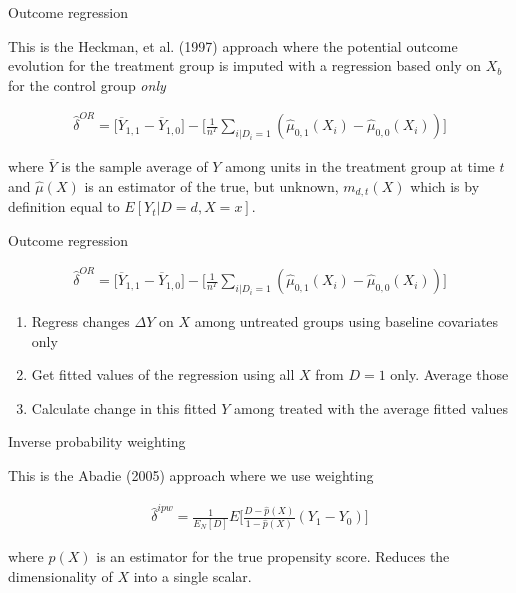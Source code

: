 \documentclass{beamer}
\begin{document}
\begin{frame}{Outcome regression}

This is the Heckman, et al. (1997) approach where the potential outcome evolution for the treatment group is imputed with a regression based only on $X_b$ for the control group \emph{only}

\bigskip

\begin{eqnarray*}
\widehat{\delta}^{OR} = \bigg [ \overline{Y}_{1,1} -  \overline{Y}_{1,0} \bigg ] -  \bigg [ \frac{1}{n^T} \sum_{i|D_i=1} ( \widehat{\mu}_{0,1}(X_i) - \widehat{\mu}_{0,0}(X_i)) \bigg ]
\end{eqnarray*}

where $\overline{Y}$ is the sample average of $Y$ among units in the treatment group at time $t$ and $\widehat{\mu}(X)$ is an estimator of the true, but unknown, $m_{d,t}(X)$ which is by definition equal to $E[Y_t|D=d,X=x]$.

\end{frame}




\begin{frame}{Outcome regression}

\begin{eqnarray*}
\widehat{\delta}^{OR} = \bigg [ \overline{Y}_{1,1} -  \overline{Y}_{1,0} \bigg ] -  \bigg [ \frac{1}{n^T} \sum_{i|D_i=1} ( \widehat{\mu}_{0,1}(X_i) - \widehat{\mu}_{0,0}(X_i)) \bigg ]
\end{eqnarray*}

\begin{enumerate}
\item Regress changes $\Delta Y$ on $X$ among untreated groups using baseline covariates only
\item Get fitted values of the regression using all $X$ from $D=1$ only.  Average those
\item Calculate change in this fitted $Y$ among treated with the average fitted values
\end{enumerate}

\end{frame}

\begin{frame}{Inverse probability weighting}

This is the Abadie (2005) approach where we use weighting

\begin{eqnarray*}
\widehat{\delta}^{ipw} = \frac{1}{E_N[D]} E \bigg [ \frac{D-\widehat{p}(X)}{1-\widehat{p}(X)} (Y_1-Y_0) \bigg ]
\end{eqnarray*}

where $\widehat{p}(X)$ is an estimator for the true propensity score. Reduces the dimensionality of $X$ into a single scalar.

\end{frame}
\end{document}
